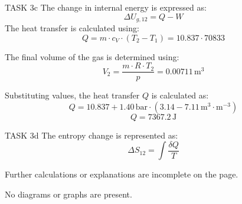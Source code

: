 TASK 3c  
The change in internal energy is expressed as:  
\[
\Delta U_{g,12} = Q - W
\]  
The heat transfer is calculated using:  
\[
Q = m \cdot c_V \cdot (T_2 - T_1) = 10.837 \cdot 70833
\]  

The final volume of the gas is determined using:  
\[
V_2 = \frac{m \cdot R \cdot T_2}{p} = 0.00711 \, \text{m}^3
\]  

Substituting values, the heat transfer \( Q \) is calculated as:  
\[
Q = 10.837 + 1.40 \, \text{bar} \cdot (3.14 - 7.11 \, \text{m}^3 \cdot \text{m}^{-3})
\]  
\[
Q = 7367.2 \, \text{J}
\]  

TASK 3d  
The entropy change is represented as:  
\[
\Delta S_{12} = \int \frac{\delta Q}{T}
\]  

Further calculations or explanations are incomplete on the page.  

No diagrams or graphs are present.